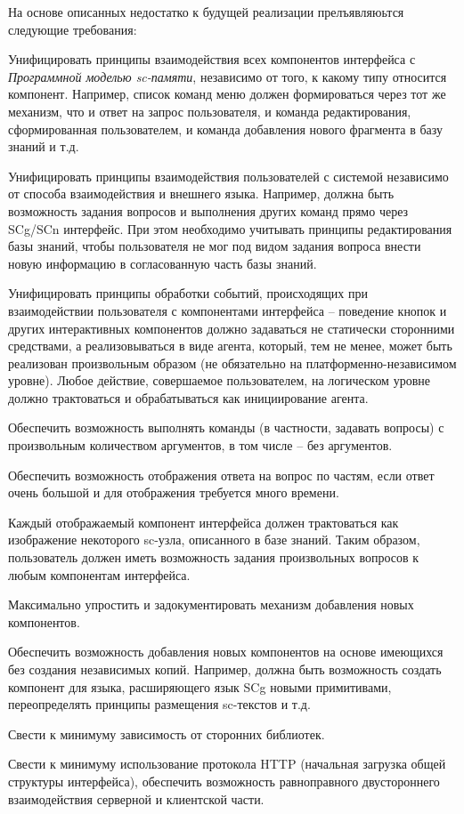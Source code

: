 На основе описанных недостатко к будущей реализации прелъявляюьтся следующие требования:
\begin{scnitemize}
    \item Унифицировать принципы взаимодействия всех компонентов интерфейса с \textit{Программной моделью sc-памяти},
    независимо от того, к какому типу относится компонент. Например, список команд меню должен формироваться через тот
    же механизм, что и ответ на запрос пользователя, и команда редактирования, сформированная пользователем, и команда
    добавления нового фрагмента в базу знаний и т.д.
    \item Унифицировать принципы взаимодействия пользователей с системой независимо от способа взаимодействия и
    внешнего языка. Например, должна быть возможность задания вопросов и выполнения других команд прямо через SCg/SCn
    интерфейс. При этом необходимо учитывать принципы редактирования базы знаний, чтобы пользователя не мог под
    видом задания вопроса внести новую информацию в согласованную часть базы знаний.
    \item Унифицировать принципы обработки событий, происходящих при взаимодействии пользователя с компонентами
    интерфейса -- поведение кнопок и других интерактивных компонентов должно задаваться не статически сторонними
    средствами, а реализовываться в виде агента, который, тем не менее, может быть реализован произвольным образом
    (не обязательно на платформенно-независимом уровне). Любое действие, совершаемое пользователем, на логическом
    уровне должно трактоваться и обрабатываться как инициирование агента.
    \item Обеспечить возможность выполнять команды (в частности, задавать вопросы) с произвольным количеством
    аргументов, в том числе -- без аргументов.
    \item Обеспечить возможность отображения ответа на вопрос по частям, если ответ очень большой и для отображения
    требуется много времени.
    \item Каждый отображаемый компонент интерфейса должен трактоваться как изображение некоторого sc-узла, описанного в
    базе знаний. Таким образом, пользователь должен иметь возможность задания произвольных вопросов к любым компонентам
    интерфейса.
    \item Максимально упростить и задокументировать механизм добавления новых компонентов.
    \item Обеспечить возможность добавления новых компонентов на основе имеющихся без создания независимых копий.
    Например, должна быть возможность создать компонент для языка, расширяющего язык SCg новыми примитивами,
    переопределять принципы размещения sc-текстов и т.д.
    \item Свести к минимуму зависимость от сторонних библиотек.
    \item Свести к минимуму использование протокола HTTP (начальная загрузка общей структуры интерфейса), обеспечить
    возможность равноправного двустороннего взаимодействия серверной и клиентской части.
\end{scnitemize}

